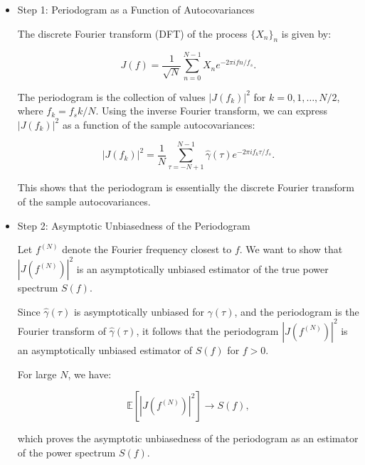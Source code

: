 \documentclass[11pt]{article}
\begin{document}
\begin{solution} %

\begin{itemize}
    

\item Step 1: Periodogram as a Function of Autocovariances

The discrete Fourier transform (DFT) of the process \(\{X_n\}_n\) is given by:

\[
J(f) = \frac{1}{\sqrt{N}} \sum_{n=0}^{N-1} X_n e^{-2\pi i f n / f_s}.
\]

The periodogram is the collection of values \(|J(f_k)|^2\) for \(k = 0, 1, \dots, N/2\), where \(f_k = f_s k / N\). Using the inverse Fourier transform, we can express \(|J(f_k)|^2\) as a function of the sample autocovariances:

\[
|J(f_k)|^2 = \frac{1}{N} \sum_{\tau=-N+1}^{N-1} \hat{\gamma}(\tau) e^{-2\pi i f_k \tau / f_s}.
\]

This shows that the periodogram is essentially the discrete Fourier transform of the sample autocovariances.

\item Step 2: Asymptotic Unbiasedness of the Periodogram

Let \(f^{(N)}\) denote the Fourier frequency closest to \(f\). We want to show that \(|J(f^{(N)})|^2\) is an asymptotically unbiased estimator of the true power spectrum \(S(f)\).

Since \(\hat{\gamma}(\tau)\) is asymptotically unbiased for \(\gamma(\tau)\), and the periodogram is the Fourier transform of \(\hat{\gamma}(\tau)\), it follows that the periodogram \(|J(f^{(N)})|^2\) is an asymptotically unbiased estimator of \(S(f)\) for \(f > 0\).

For large \(N\), we have:

\[
\mathbb{E}[|J(f^{(N)})|^2] \to S(f),
\]

which proves the asymptotic unbiasedness of the periodogram as an estimator of the power spectrum \(S(f)\).
\end{itemize}

    
\end{solution} %
\end{document}
